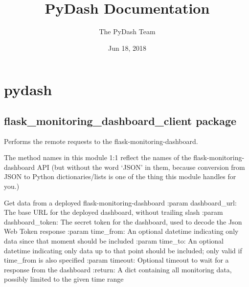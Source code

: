 \documentclass[letterpaper,10pt,english]{sphinxmanual}
\title{PyDash Documentation}
\date{Jun 18, 2018}
\author{The PyDash Team}
\begin{document}
\maketitle
\sphinxtableofcontents
{}\label{\detokenize{index::doc}}



\chapter{pydash}
\label{\detokenize{modules:pydash}}\label{\detokenize{modules:welcome-to-pydash-s-documentation}}\label{\detokenize{modules::doc}}

\section{flask\_monitoring\_dashboard\_client package}
\label{\detokenize{flask_monitoring_dashboard_client:flask-monitoring-dashboard-client-package}}\label{\detokenize{flask_monitoring_dashboard_client:module-flask_monitoring_dashboard_client}}\label{\detokenize{flask_monitoring_dashboard_client::doc}}
Performs the remote requests to the flask-monitoring-dashboard.

The method names in this module 1:1 reflect the names of the flask-monitoring-dashboard API
(but without the word ‘JSON’ in them, because conversion from JSON to Python dictionaries/lists
is one of the thing this module handles for you.)

\begin{fulllineitems}
\label{\detokenize{flask_monitoring_dashboard_client:flask_monitoring_dashboard_client.get_data}}
Get data from a deployed flask-monitoring-dashboard
:param dashboard\_url: The base URL for the deployed dashboard, without trailing slash
:param dashboard\_token: The secret token for the dashboard, used to decode the Json Web Token response
:param time\_from: An optional datetime indicating only data since that moment should be included
:param time\_to: An optional datetime indicating only data up to that point should be included;
only valid if time\_from is also specified
:param timeout: Optional timeout to wait for a response from the dashboard
:return: A dict containing all monitoring data, possibly limited to the given time range

\end{fulllineitems}
\end{document}
